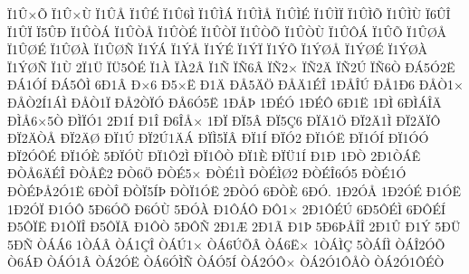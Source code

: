 {^^cf1^^db^^d7^^d5
^^cf1^^db^^d7^^d9
^^cf1^^db^^c5
^^cf1^^db^^c9
^^cf1^^db6^^cc
^^cf1^^db^^cc^^c1
^^cf1^^db^^cc^^c5
^^cf1^^db^^cc^^c9
^^cf1^^db^^cc^^cf
^^cf1^^db^^cc^^d5
^^cf1^^db^^cc^^d9
^^cf6^^db^^ce
^^cf1^^db^^cf
^^cf5^^db^^d0
^^cf1^^db^^d2^^c1
^^cf1^^db^^d2^^c5
^^cf1^^db^^d2^^c9
^^cf1^^db^^d2^^cf
^^cf1^^db^^d2^^d5
^^cf1^^db^^d2^^d9
^^cf1^^db^^d4^^c1
^^cf1^^db^^d5
^^cf1^^db^^d8^^c5
^^cf1^^db^^d8^^c9
^^cf1^^db^^d8^^c0
^^cf1^^db^^d8^^d1
^^cf1^^dd^^c1
^^cf1^^dd^^c5
^^cf1^^dd^^c9
^^cf1^^dd^^cf
^^cf1^^dd^^d5
^^cf1^^dd^^d8^^c5
^^cf1^^dd^^d8^^c9
^^cf1^^dd^^d8^^c0
^^cf1^^dd^^d8^^d1
^^cf1^^d9
2^^cf1^^dc
^^cf^^dc5^^d4^^c9
^^cf1^^c0
^^cf^^c02^^c2
^^cf1^^d1
^^cf^^d16^^c2
^^cf^^d12^^d7
^^cf^^d12^^c4
^^cf^^d12^^da
^^cf^^d16^^d2
^^d0^^c15^^d32^^cb
^^d0^^c11^^d3^^cd
^^d0^^c15^^d4^^cc
6^^d01^^c2
^^d0^^d76
^^d05^^d7^^cb
^^d01^^c4
^^d0^^c55^^c4^^d6
^^d0^^c5^^c41^^c9^^ce
1^^d0^^c5^^ce^^da
^^d0^^c51^^d06
^^d0^^c5^^d21^^d7
^^d0^^c5^^d22^^cd1^^c1^^cc
^^d0^^c5^^d21^^cf
^^d0^^c52^^d2^^cf^^d3
^^d0^^c56^^d35^^cb
1^^d0^^c5^^de
1^^d0^^c9^^d3
1^^d0^^c9^^d4
6^^d01^^cb
1^^d0^^cc
6^^d0^^cc^^c1^^ce^^c4
^^d0^^cc^^c56^^d75^^d2
^^d0^^cc^^cf^^d31
2^^d01^^cd
^^d01^^ce
^^d06^^ce^^c5^^d7
1^^d0^^cf
^^d0^^cf5^^c2
^^d0^^cf5^^c76
^^d0^^cf^^c41^^d6
^^d0^^cf2^^c41^^cc
^^d0^^cf2^^c4^^cf^^d4
^^d0^^cf2^^c4^^d2^^c5
^^d0^^cf2^^c4^^d8
^^d0^^cf1^^da
^^d0^^cf2^^da1^^c4^^c1
^^d0^^cf^^cc5^^cf^^c2
^^d0^^cf1^^cd
^^d0^^cf^^d32
^^d0^^cf1^^d3^^cb
^^d0^^cf1^^d3^^cd
^^d0^^cf1^^d3^^d3
^^d0^^cf2^^d3^^d4^^c9
^^d0^^cf1^^d3^^c8
5^^d0^^cf^^d3^^d9
^^d0^^cf1^^d42^^cc
^^d0^^cf1^^d4^^d2
^^d0^^cf1^^c8
^^d0^^cf^^dc1^^cd
^^d01^^d0
1^^d0^^d2
2^^d01^^d2^^c1^^ca
^^d0^^d2^^c56^^c4^^c9^^ce
^^d0^^d2^^c5^^ca2
^^d0^^d26^^d6
^^d0^^d2^^c95^^d7
^^d0^^d2^^c91^^cc
^^d0^^d2^^c9^^cc^^d82
^^d0^^d2^^c9^^ce6^^d35
^^d0^^d2^^c91^^d3
^^d0^^d2^^c9^^de^^c52^^d31^^cb
6^^d0^^d2^^ce
^^d0^^d2^^cf5^^cd^^de
^^d0^^d2^^cf1^^d3^^cb
2^^d0^^d2^^d3
6^^d0^^d2^^c8
6^^d0^^d3.
1^^d02^^d3^^c5
1^^d02^^d3^^c9
^^d01^^d3^^cb
1^^d02^^d3^^cf
^^d01^^d3^^d4
5^^d06^^d3^^d5
^^d06^^d3^^d9
5^^d0^^d3^^c0
^^d01^^d4^^c1^^d4
^^d0^^d41^^d7
2^^d01^^d4^^c9^^da
6^^d05^^d4^^c9^^cc
6^^d0^^d4^^c9^^cd
^^d05^^d4^^cf^^cb
^^d01^^d4^^cf^^ce
^^d05^^d4^^cf^^c3
^^d01^^d4^^d2
5^^d0^^d4^^d1
2^^d01^^c6
2^^d01^^c3
^^d01^^de
5^^d06^^de^^c5^^ce^^ce
2^^d01^^db
^^d01^^dd
5^^d0^^dc
5^^d0^^d1
^^d2^^c1^^c16
1^^d2^^c1^^c2
^^d2^^c11^^c7^^ce
^^d2^^c1^^da1^^d7
^^d2^^c16^^da^^d5^^c2
^^d2^^c16^^cb^^d7
1^^d2^^c1^^cc^^c7
5^^d2^^c1^^cd^^cc
^^d2^^c1^^ce2^^d3^^d5
^^d26^^c1^^d0
^^d2^^c1^^d31^^c2
^^d2^^c12^^d3^^cb
^^d2^^c16^^d3^^cc^^d1
^^d2^^c1^^d35^^cd
^^d2^^c12^^d3^^d4^^d7
^^d2^^c12^^d31^^d4^^c5^^d2
^^d2^^c12^^d31^^d4^^c9^^d2
}
